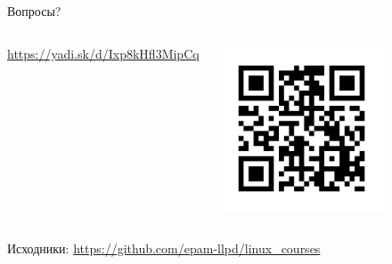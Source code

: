 \begin{frame}[fragile]{Вопросы?}
    \setcounter{tocdepth}{2}
    \tableofcontents

    \skip

    \hline
    \begin{columns}
            \url{https://yadi.sk/d/Ixp8kHfl3MipCq}
        \begin{center}
            \includegraphics[width=0.7\textwidth]{url-qr-2017}
        \end{center}
    \end{columns}

    Исходники: \url{https://github.com/epam-llpd/linux_courses}

\end{frame}
